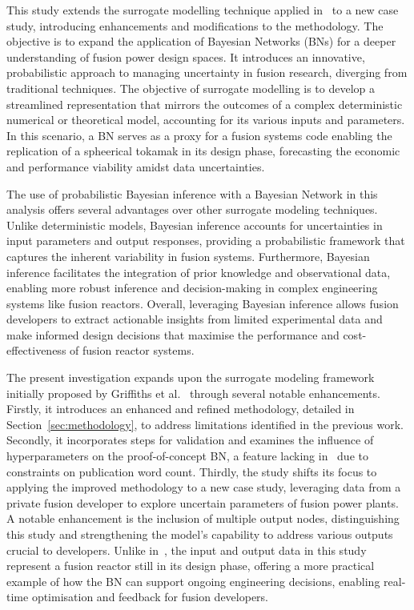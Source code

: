 \documentclass[journal]{IEEEtran}
\begin{document}
This study extends the surrogate modelling technique applied in~\cite{Griffiths2024} to a new case study, introducing enhancements and modifications to the methodology. The objective is to expand the application of Bayesian Networks (BNs) for a deeper understanding of fusion power design spaces. It introduces an innovative, probabilistic approach to managing uncertainty in fusion research, diverging from traditional techniques. The objective of surrogate modelling is to develop a streamlined representation that mirrors the outcomes of a complex deterministic numerical or theoretical model, accounting for its various inputs and parameters. In this scenario, a BN serves as a proxy for a fusion systems code enabling the replication of a spheerical tokamak in its design phase, forecasting the economic and performance viability amidst data uncertainties.

The use of probabilistic Bayesian inference with a Bayesian Network in this analysis offers several advantages over other surrogate modeling techniques. Unlike deterministic models, Bayesian inference accounts for uncertainties in input parameters and output responses, providing a probabilistic framework that captures the inherent variability in fusion systems. Furthermore, Bayesian inference facilitates the integration of prior knowledge and observational data, enabling more robust inference and decision-making in complex engineering systems like fusion reactors. Overall, leveraging Bayesian inference allows fusion developers to extract actionable insights from limited experimental data and make informed design decisions that maximise the performance and cost-effectiveness of fusion reactor systems.

The present investigation expands upon the surrogate modeling framework initially proposed by Griffiths et al.~\cite{Griffiths2024} through several notable enhancements. Firstly, it introduces an enhanced and refined methodology, detailed in Section~\ref{sec:methodology}, to address limitations identified in the previous work. Secondly, it incorporates steps for validation and examines the influence of hyperparameters on the proof-of-concept BN, a feature lacking in~\cite{Griffiths2024} due to constraints on publication word count. Thirdly, the study shifts its focus to applying the improved methodology to a new case study, leveraging data from a private fusion developer to explore uncertain parameters of fusion power plants. A notable enhancement is the inclusion of multiple output nodes, distinguishing this study and strengthening the model's capability to address various outputs crucial to developers. Unlike in~\cite{Griffiths2024}, the input and output data in this study represent a fusion reactor still in its design phase, offering a more practical example of how the BN can support ongoing engineering decisions, enabling real-time optimisation and feedback for fusion developers.
\end{document}
